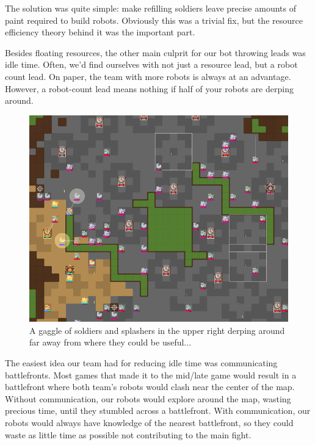 \medskip

The solution was quite simple: make refilling soldiers leave precise amounts of paint required to build robots. Obviously this was a trivial fix, but the resource efficiency theory behind it was the important part.


Besides floating resources, the other main culprit for our bot throwing leads was idle time. Often, we'd find ourselves with not just a resource lead, but a robot count lead. On paper, the team with more robots is always at an advantage. However, a robot-count lead means nothing if half of your robots are derping around.

\begin{figure}[h]
    \centering
    \includegraphics[scale=0.5]{images/idle_time.png}
    \caption{A gaggle of soldiers and splashers in the upper right derping around far away from where they could be useful...}
\end{figure}

The easiest idea our team had for reducing idle time was communicating battlefronts. Most games that made it to the mid/late game would result in a battlefront where both team's robots would clash near the center of the map. Without communication, our robots would explore around the map, wasting precious time, until they stumbled across a battlefront. With communication, our robots would always have knowledge of the nearest battlefront, so they could waste as little time as possible not contributing to the main fight.

